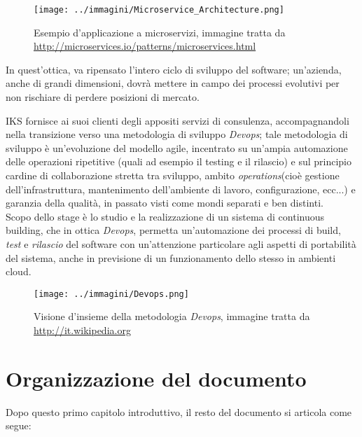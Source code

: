 \begin{figure}[H]
    \capstart
    \centering
    \texttt{[image: ../immagini/Microservice\_Architecture.png]}
    \caption{Esempio d'applicazione a microservizi, immagine tratta da \\ \url{http://microservices.io/patterns/microservices.html}}
\end{figure}

In quest'ottica, va ripensato l'intero ciclo di sviluppo del software; un'azienda, anche di grandi dimensioni, dovrà mettere in campo dei processi evolutivi per non rischiare di perdere posizioni di mercato. 

IKS fornisce ai suoi clienti degli appositi servizi di consulenza, accompagnandoli nella transizione verso una metodologia di sviluppo \textit{Devops}; tale metodologia di sviluppo è un'evoluzione del modello \gls{agile}, incentrato su un'ampia automazione delle operazioni ripetitive (quali ad esempio il testing e il rilascio) e sul principio cardine di collaborazione stretta tra sviluppo, ambito \textit{operations}(cioè gestione dell'infrastruttura, mantenimento dell'ambiente di lavoro, configurazione, ecc...) e garanzia della qualità, in passato visti come mondi separati e ben distinti. \\

Scopo dello stage è lo studio e la realizzazione di un sistema di \gls{continuous building}, che in ottica \textit{Devops}, permetta un'automazione dei processi di \gls{build}, \textit{test} e \textit{rilascio} del software con un'attenzione particolare agli aspetti di portabilità del sistema, anche in previsione di un funzionamento dello stesso in ambienti \gls{cloud}.

\begin{figure}[H]
    \capstart
    \centering
    \texttt{[image: ../immagini/Devops.png]}
    \caption{Visione d'insieme della metodologia \textit{Devops}, immagine tratta da \\ \url{http://it.wikipedia.org}}
\end{figure}

\section{Organizzazione del documento}

Dopo questo primo capitolo introduttivo, il resto del documento si articola come segue:

